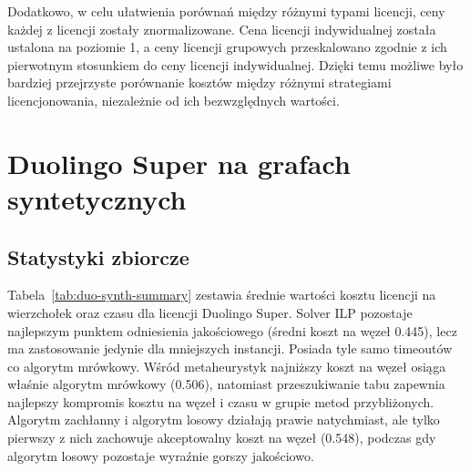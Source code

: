 Dodatkowo, w celu ułatwienia porównań między różnymi typami licencji, ceny każdej z licencji zostały znormalizowane. Cena licencji indywidualnej została ustalona na poziomie 1, a ceny licencji grupowych przeskalowano zgodnie z ich pierwotnym stosunkiem do ceny licencji indywidualnej. Dzięki temu możliwe było bardziej przejrzyste porównanie kosztów między różnymi strategiami licencjonowania, niezależnie od ich bezwzględnych wartości.

\section{Duolingo Super na grafach syntetycznych}

\subsection{Statystyki zbiorcze}
Tabela~\ref{tab:duo-synth-summary} zestawia średnie wartości kosztu licencji na wierzchołek oraz czasu dla licencji Duolingo Super. Solver ILP pozostaje najlepszym punktem odniesienia jakościowego (średni koszt na węzeł 0.445), lecz ma zastosowanie jedynie dla mniejszych instancji. Posiada tyle samo timeoutów co algorytm mrówkowy. Wśród metaheurystyk najniższy koszt na węzeł osiąga właśnie algorytm mrówkowy (0.506), natomiast przeszukiwanie tabu zapewnia najlepszy kompromis kosztu na węzeł i czasu w grupie metod przybliżonych. Algorytm zachłanny i algorytm losowy działają prawie natychmiast, ale tylko pierwszy z nich zachowuje akceptowalny koszt na węzeł (0.548), podczas gdy algorytm losowy pozostaje wyraźnie gorszy jakościowo.

